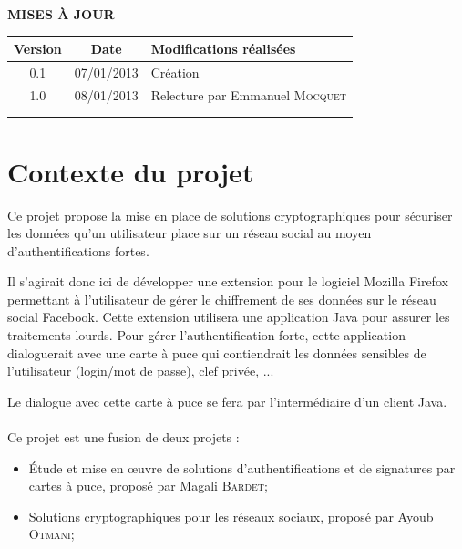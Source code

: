 \documentclass[a4paper,11pt,french]{article}
\begin{document}
\makeFirstPage
\clearpage

\vspace*{1cm}
\begin{center}
\textbf{\huge{MISES À JOUR}}\\
\vspace*{3cm}
	\begin{tabularx}{16cm}{|c|c|X|}
	\hline
	\bfseries{Version} & \bfseries{Date} & \bfseries{Modifications réalisées}\\
	\hline
	0.1 & 07/01/2013 & Création\\
	\hline
	1.0 & 08/01/2013 & Relecture par Emmanuel \textsc{Mocquet}\\
	\hline
	&&\\
	\hline
	&&\\
	\hline
	\end{tabularx}
\end{center}

\clearpage
\tableofcontents
\clearpage

\section{Contexte du projet}
Ce projet propose la mise en place de solutions cryptographiques pour sécuriser
les données qu'un utilisateur place sur un réseau social au moyen  
d'authentifications fortes.

Il s'agirait donc ici de développer une extension pour le logiciel
Mozilla Firefox permettant à l'utilisateur de gérer le chiffrement de 
ses données sur le réseau social Facebook. Cette extension utilisera une 
application Java pour assurer les traitements lourds. Pour gérer 
l'authentification forte, cette application dialoguerait avec une carte à 
puce qui contiendrait les données sensibles de l'utilisateur 
(login/mot de passe), clef privée, ...

Le dialogue avec cette carte à puce se fera par l'intermédiaire d'un
client Java.

\paragraph{}
Ce projet est une fusion de deux projets :
\begin{itemize}
    \item Étude et mise en \oe{}uvre de solutions d'authentifications 
    et de signatures par cartes à puce, proposé par Magali \textsc{Bardet};
    \item Solutions cryptographiques pour les réseaux sociaux, 
    proposé par Ayoub \textsc{Otmani};
\end{itemize}
\end{document}
